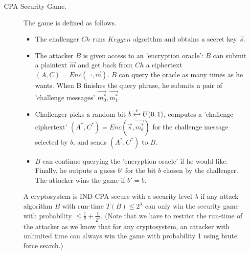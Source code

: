 \begin{description}
\begin{description}
                    \begin{description}
                        \item[CPA Security Game.] The game is defined as
                            follows.
                    \begin{itemize}
                        \item The challenger $Ch$ runs $Keygen$ algorithm and
                            obtains a
                            secret key $\vec{s}$.
                        \item The attacker $B$ is given access to an 'encryption
                            oracle': $B$ can submit a plaintext $\vec{m}$
                            and get back from $Ch$ a ciphertext $(A,C) =
                            Enc(\vec{}, \vec{m})$. $B$ can query the oracle as
                            many times as he wants. When B finishes the query
                            phrase, he submits a pair of 'challenge messages'
                            $\vec{m_0^*},\vec{m_1^*}$.
                        \item Challenger picks a random bit $b \stackrel{r}{\hookleftarrow}
                            U(0,1)$, computes a 'challenge ciphertext'
                            $(A^*, C^*) = Enc(\vec{s}, \vec{m_b^*})$ for the
                            challenge message selected by $b$, and sends
                            $(A^*, C^*)$ to  $B$.
                        \item $B$ can continue querying the 'encryption oracle'
                            if he would like. Finally, he outputs a guess
                            $b'$ for the bit $b$ chosen by the challenger. The
                            attacker wins the game if $b' = b$.
                    \end{itemize}
                    \begin{definition}
                         A cryptosystem is IND-CPA secure
                        with a security level $\lambda$
                        if any attack algorithm $B$ with
                        run-time $T(B) \leq 2^\lambda$ can only win the security game
                        with probability $\leq \frac{1}{2} +
                        \frac{1}{2^\lambda}$.
                    (Note that we have to restrict the run-time of the attacker
                    as we know that for any cryptosystem, an attacker with
                    unlimited time can always win the game with probability 1
                    using brute force search.)
                        \label{def:IND-CPA Security}
                    \end{definition}


\end{description}
\end{description}
\end{description}
